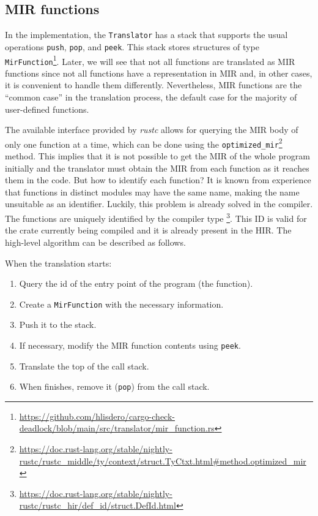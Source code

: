 \subsection{MIR functions}

In the implementation, the \texttt{Translator} has a stack
that supports the usual operations \texttt{push}, \texttt{pop}, and \texttt{peek}.
This stack stores structures of type \texttt{MirFunction}\footnote{\url{https://github.com/hlisdero/cargo-check-deadlock/blob/main/src/translator/mir_function.rs}}.
Later, we will see that not all functions are translated as \acrshort{MIR} functions
since not all functions have a representation in \acrshort{MIR}
and, in other cases, it is convenient to handle them differently.
Nevertheless, \acrshort{MIR} functions are the ``common case'' in the translation process,
the default case for the majority of user-defined functions.

The available interface provided by \emph{rustc}
allows for querying the \acrshort{MIR} body of only one function at a time,
which can be done using the \texttt{optimized\_mir}\footnote{\url{https://doc.rust-lang.org/stable/nightly-rustc/rustc_middle/ty/context/struct.TyCtxt.html\#method.optimized\_mir}}
method.
This implies that it is not possible to get the \acrshort{MIR} of the whole program initially
and the translator must obtain the \acrshort{MIR} from each function as it reaches them in the code.
But how to identify each function?
It is known from experience that functions in distinct modules may have the same name,
making the name unsuitable as an identifier.
Luckily, this problem is already solved in the compiler.
The functions are uniquely identified by the compiler type \footnote{\url{https://doc.rust-lang.org/stable/nightly-rustc/rustc_hir/def_id/struct.DefId.html}}.
This ID is valid for the crate currently being compiled and it is already present in the \acrshort{HIR}.
The high-level algorithm can be described as follows.

When the translation starts:

\begin{enumerate}
    \item Query the id of the entry point of the program (the  function).
    \item Create a \texttt{MirFunction} with the necessary information.
    \item Push it to the stack.
    \item If necessary, modify the \acrshort{MIR} function contents using \texttt{peek}.
    \item Translate the top of the call stack.
    \item When  finishes, remove it (\texttt{pop}) from the call stack.
\end{enumerate}

